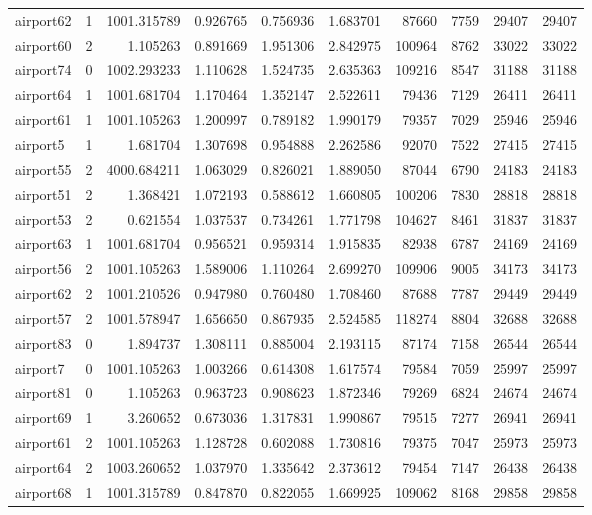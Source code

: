 \begin{longtable}{|l|r|r|r|r|r|r|r|r|r|}
airport62 & 1 & 1001.315789 & 0.926765 & 0.756936 & 1.683701 & 87660 & 7759 & 29407 & 29407 \\
airport60 & 2 & 1.105263 & 0.891669 & 1.951306 & 2.842975 & 100964 & 8762 & 33022 & 33022 \\
airport74 & 0 & 1002.293233 & 1.110628 & 1.524735 & 2.635363 & 109216 & 8547 & 31188 & 31188 \\
airport64 & 1 & 1001.681704 & 1.170464 & 1.352147 & 2.522611 & 79436 & 7129 & 26411 & 26411 \\
airport61 & 1 & 1001.105263 & 1.200997 & 0.789182 & 1.990179 & 79357 & 7029 & 25946 & 25946 \\
airport5 & 1 & 1.681704 & 1.307698 & 0.954888 & 2.262586 & 92070 & 7522 & 27415 & 27415 \\
airport55 & 2 & 4000.684211 & 1.063029 & 0.826021 & 1.889050 & 87044 & 6790 & 24183 & 24183 \\
airport51 & 2 & 1.368421 & 1.072193 & 0.588612 & 1.660805 & 100206 & 7830 & 28818 & 28818 \\
airport53 & 2 & 0.621554 & 1.037537 & 0.734261 & 1.771798 & 104627 & 8461 & 31837 & 31837 \\
airport63 & 1 & 1001.681704 & 0.956521 & 0.959314 & 1.915835 & 82938 & 6787 & 24169 & 24169 \\
airport56 & 2 & 1001.105263 & 1.589006 & 1.110264 & 2.699270 & 109906 & 9005 & 34173 & 34173 \\
airport62 & 2 & 1001.210526 & 0.947980 & 0.760480 & 1.708460 & 87688 & 7787 & 29449 & 29449 \\
airport57 & 2 & 1001.578947 & 1.656650 & 0.867935 & 2.524585 & 118274 & 8804 & 32688 & 32688 \\
airport83 & 0 & 1.894737 & 1.308111 & 0.885004 & 2.193115 & 87174 & 7158 & 26544 & 26544 \\
airport7 & 0 & 1001.105263 & 1.003266 & 0.614308 & 1.617574 & 79584 & 7059 & 25997 & 25997 \\
airport81 & 0 & 1.105263 & 0.963723 & 0.908623 & 1.872346 & 79269 & 6824 & 24674 & 24674 \\
airport69 & 1 & 3.260652 & 0.673036 & 1.317831 & 1.990867 & 79515 & 7277 & 26941 & 26941 \\
airport61 & 2 & 1001.105263 & 1.128728 & 0.602088 & 1.730816 & 79375 & 7047 & 25973 & 25973 \\
airport64 & 2 & 1003.260652 & 1.037970 & 1.335642 & 2.373612 & 79454 & 7147 & 26438 & 26438 \\
airport68 & 1 & 1001.315789 & 0.847870 & 0.822055 & 1.669925 & 109062 & 8168 & 29858 & 29858 \\

\end{longtable}
